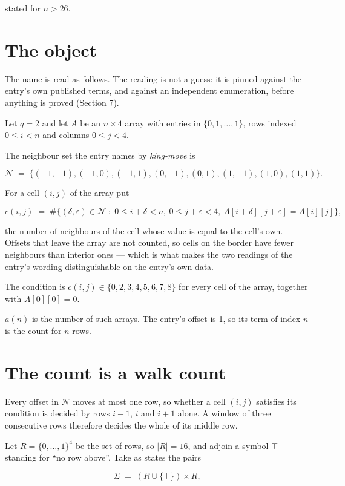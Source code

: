 \documentclass[11pt]{article}
\theoremstyle{definition}
\begin{document}
stated for $n > 26$.

\section{The object}

The name is read as follows. The reading is not a guess: it is pinned against the entry's own published terms, and against an independent enumeration, before anything is proved (Section 7).

Let $q = 2$ and let $A$ be an $n \times 4$ array with entries in $\{0,1,\dots,1\}$, rows indexed $0 \le i < n$ and columns $0 \le j < 4$.

The neighbour set the entry names by {\itshape king-move} is

\[\mathcal{N} \;=\; \{(-1,-1), (-1,0), (-1,1), (0,-1), (0,1), (1,-1), (1,0), (1,1)\}.\]

For a cell $(i,j)$ of the array put

\[c(i,j) \;=\; \#\bigl\{(\delta,\varepsilon)\in\mathcal{N} \;:\; 0\le i+\delta<n,\ 0\le j+\varepsilon<4,\ A[i+\delta][j+\varepsilon] = A[i][j]\bigr\},\]

the number of neighbours of the cell whose value is equal to the cell's own. Offsets that leave the array are not counted, so cells on the border have fewer neighbours than interior ones --- which is what makes the two readings of the entry's wording distinguishable on the entry's own data.

The condition is $c(i,j) \in \{0, 2, 3, 4, 5, 6, 7, 8\}$ for every cell of the array, together with $A[0][0]=0$.

$a(n)$ is the number of such arrays. The entry's offset is 1, so its term of index $n$ is the count for $n$ rows.

\section{The count is a walk count}

Every offset in $\mathcal{N}$ moves at most one row, so whether a cell $(i,j)$ satisfies its condition is decided by rows $i-1$, $i$ and $i+1$ alone. A window of three consecutive rows therefore decides the whole of its middle row.

Let $R = \{0,\dots,1\}^{4}$ be the set of rows, so $|R| = 16$, and adjoin a symbol $\top$ standing for ``no row above''. Take as states the pairs

\[\Sigma \;=\; (R \cup \{\top\}) \times R,\]
\end{document}
